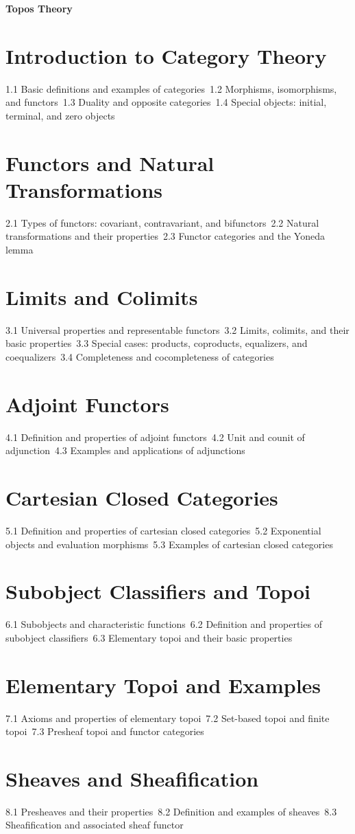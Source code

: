 {\LARGE \bf{Topos Theory}}
\section{Introduction to Category Theory}
1.1 Basic definitions and examples of categories\
1.2 Morphisms, isomorphisms, and functors\
1.3 Duality and opposite categories\
1.4 Special objects: initial, terminal, and zero objects\
\section{Functors and Natural Transformations}
2.1 Types of functors: covariant, contravariant, and bifunctors\
2.2 Natural transformations and their properties\
2.3 Functor categories and the Yoneda lemma\
\section{Limits and Colimits}
3.1 Universal properties and representable functors\
3.2 Limits, colimits, and their basic properties\
3.3 Special cases: products, coproducts, equalizers, and coequalizers\
3.4 Completeness and cocompleteness of categories\
\section{Adjoint Functors}
4.1 Definition and properties of adjoint functors\
4.2 Unit and counit of adjunction\
4.3 Examples and applications of adjunctions\
\section{Cartesian Closed Categories}
5.1 Definition and properties of cartesian closed categories\
5.2 Exponential objects and evaluation morphisms\
5.3 Examples of cartesian closed categories\
\section{Subobject Classifiers and Topoi}
6.1 Subobjects and characteristic functions\
6.2 Definition and properties of subobject classifiers\
6.3 Elementary topoi and their basic properties\
\section{Elementary Topoi and Examples}
7.1 Axioms and properties of elementary topoi\
7.2 Set-based topoi and finite topoi\
7.3 Presheaf topoi and functor categories\
\section{Sheaves and Sheafification}
8.1 Presheaves and their properties\
8.2 Definition and examples of sheaves\
8.3 Sheafification and associated sheaf functor\
